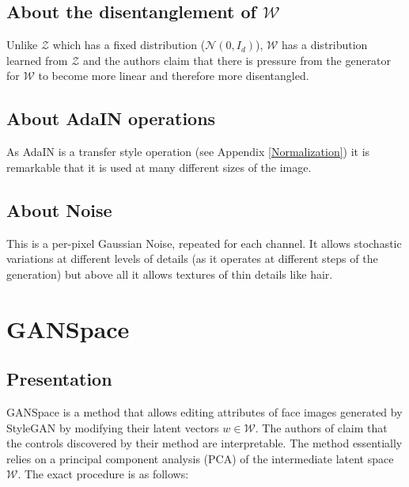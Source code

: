\documentclass[a4paper]{article}
\begin{document}
\subsection{About the disentanglement of $\mathcal{W}$}

Unlike $\mathcal{Z}$ which has a fixed distribution ($\mathcal{N}(0, I_d)$), $\mathcal{W}$ has a distribution learned from $\mathcal{Z}$ and the authors claim that there is pressure from the generator for $\mathcal{W}$ to become more linear and therefore more disentangled.

\subsection{About AdaIN operations}

As AdaIN is a transfer style operation (see Appendix \ref{Normalization}) it is remarkable that it is used at many different sizes of the image.

\subsection{About Noise}

This is a per-pixel Gaussian Noise, repeated for each channel.
It allows stochastic variations at different levels of details (as it operates at different steps of the generation) but above all it allows textures of thin details like hair. %



\section{GANSpace}

\subsection{Presentation}

GANSpace \cite{harkonen2020ganspace} is a method that allows editing attributes of face images generated by StyleGAN by modifying their latent vectors $w \in \mathcal{W}$. The authors of \cite{harkonen2020ganspace} claim that the controls discovered by their method are interpretable. The method essentially relies on a principal component analysis (PCA) of the intermediate latent space $\mathcal{W}$. The exact procedure is as follows:
\end{document}
